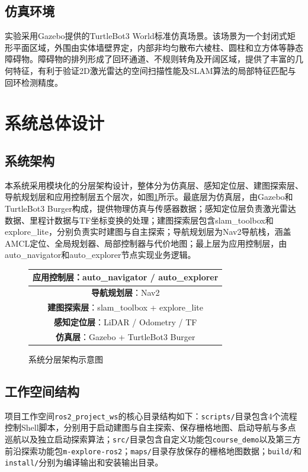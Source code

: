 \documentclass[a4paper,12pt]{article}
\begin{document}
\subsection{仿真环境}

实验采用Gazebo提供的TurtleBot3 World标准仿真场景。该场景为一个封闭式矩形平面区域，外围由实体墙壁界定，内部非均匀散布六棱柱、圆柱和立方体等静态障碍物。障碍物的排列形成了回环通道、不规则转角及开阔区域，提供了丰富的几何特征，有利于验证2D激光雷达的空间扫描性能及SLAM算法的局部特征匹配与回环检测精度。

\section{系统总体设计}

\subsection{系统架构}

本系统采用模块化的分层架构设计，整体分为仿真层、感知定位层、建图探索层、导航规划层和应用控制层五个层次，如图\ref{fig:architecture}所示。最底层为仿真层，由Gazebo和TurtleBot3 Burger构成，提供物理仿真与传感器数据；感知定位层负责激光雷达数据、里程计数据与TF坐标变换的处理；建图探索层包含slam\_toolbox和explore\_lite，分别负责实时建图与自主探索；导航规划层为Nav2导航栈，涵盖AMCL定位、全局规划器、局部控制器与代价地图；最上层为应用控制层，由auto\_navigator和auto\_explorer节点实现业务逻辑。

\begin{figure}[H]
\centering
\begin{tabular}{|c|}
\hline
\textbf{应用控制层}：auto\_navigator / auto\_explorer \\
\hline
\textbf{导航规划层}：Nav2  \\
\hline
\textbf{建图探索层}：slam\_toolbox + explore\_lite \\
\hline
\textbf{感知定位层}：LiDAR / Odometry / TF \\
\hline
\textbf{仿真层}：Gazebo + TurtleBot3 Burger \\
\hline
\end{tabular}
\caption{系统分层架构示意图}
\label{fig:architecture}
\end{figure}

\subsection{工作空间结构}

项目工作空间\texttt{ros2\_project\_ws}的核心目录结构如下：\texttt{scripts/}目录包含4个流程控制Shell脚本，分别用于启动建图与自主探索、保存栅格地图、启动导航与多点巡航以及独立启动探索算法；\texttt{src/}目录包含自定义功能包\texttt{course\_demo}以及第三方前沿探索功能包\texttt{m-explore-ros2}；\texttt{maps/}目录存放保存的栅格地图数据；\texttt{build/}和\texttt{install/}分别为编译输出和安装输出目录。
\end{document}
